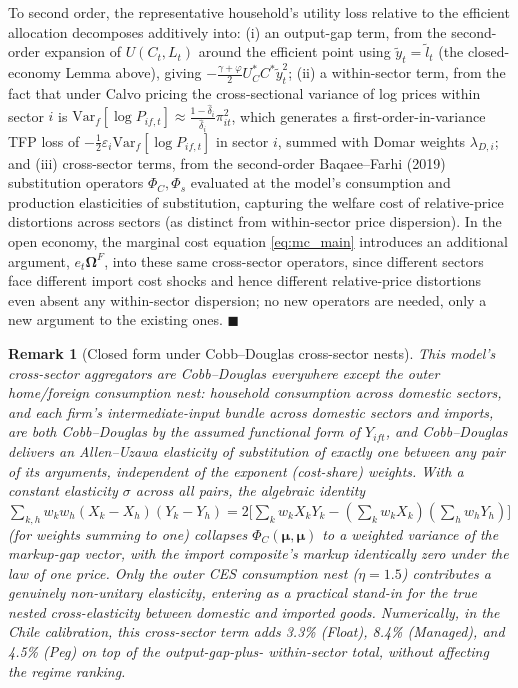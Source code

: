 \documentclass[12pt]{article}
\newtheorem{remark}{Remark}
\begin{document}
To second order, the representative household's utility loss relative to the efficient allocation
decomposes additively into: (i) an output-gap term, from the second-order expansion of
$U(C_t,L_t)$ around the efficient point using $\tilde y_t=\tilde l_t$ (the closed-economy Lemma
above), giving $-\tfrac{\gamma+\varphi}{2}U_C^*C^*\tilde y_t^2$; (ii) a within-sector term, from the
fact that under Calvo pricing the cross-sectional variance of log prices within sector $i$ is
$\mathrm{Var}_f[\log P_{if,t}]\approx\tfrac{1-\hat\delta_i}{\hat\delta_i}\pi_{it}^2$, which generates a
first-order-in-variance TFP loss of $-\tfrac12\varepsilon_i\mathrm{Var}_f[\log P_{if,t}]$ in sector
$i$, summed with Domar weights $\lambda_{D,i}$; and (iii) cross-sector terms, from the second-order
Baqaee--Farhi (2019) substitution operators $\Phi_C,\Phi_s$ evaluated at the model's consumption and
production elasticities of substitution, capturing the welfare cost of relative-price distortions
across sectors (as distinct from within-sector price dispersion). In the open economy, the marginal
cost equation \eqref{eq:mc_main} introduces an additional argument, $e_t\bm\Omega^F$, into these same
cross-sector operators, since different sectors face different import cost shocks and hence different
relative-price distortions even absent any within-sector dispersion; no new operators are needed, only
a new argument to the existing ones. $\blacksquare$

\begin{remark}[Closed form under Cobb--Douglas cross-sector nests]
\label{rem:cross_sector_numeric}
This model's cross-sector aggregators are Cobb--Douglas everywhere except the outer home/foreign
consumption nest: household consumption across domestic sectors, and each firm's intermediate-input
bundle across domestic sectors and imports, are both Cobb--Douglas by the assumed functional form of
$Y_{ift}$, and Cobb--Douglas delivers an Allen--Uzawa elasticity of substitution of exactly one between
any pair of its arguments, independent of the exponent (cost-share) weights. With a constant
elasticity $\sigma$ across all pairs, the algebraic identity $\sum_{k,h}w_kw_h(X_k-X_h)(Y_k-Y_h) =
2\big[\sum_kw_kX_kY_k - (\sum_kw_kX_k)(\sum_hw_hY_h)\big]$ (for weights summing to one) collapses
$\Phi_C(\bm\mu,\bm\mu)$ to a weighted variance of the markup-gap vector, with the import composite's
markup identically zero under the law of one price. Only the outer CES consumption nest ($\eta=1.5$)
contributes a genuinely non-unitary elasticity, entering as a practical stand-in for the true nested
cross-elasticity between domestic and imported goods. Numerically, in the Chile calibration, this
cross-sector term adds 3.3\% (Float), 8.4\% (Managed), and 4.5\% (Peg) on top of the output-gap-plus-
within-sector total, without affecting the regime ranking.
\end{remark}
\end{document}
